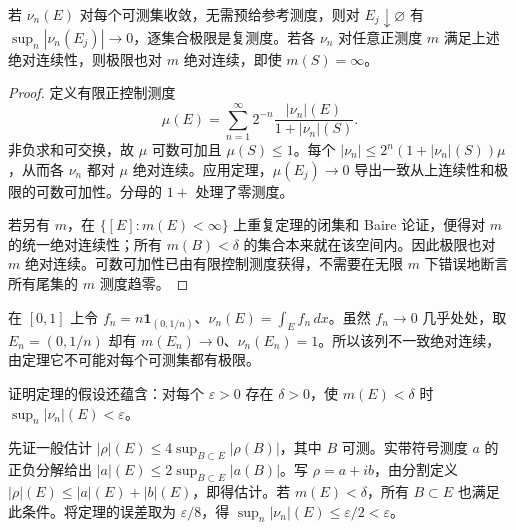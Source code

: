 \begin{corollary}[一致可数可加性与无限参考测度]\label{cor:y2-nikodym}
若 $\nu_n(E)$ 对每个可测集收敛，无需预给参考测度，则对 $E_j\downarrow\varnothing$ 有 $\sup_n|\nu_n(E_j)|\to0$，逐集合极限是复测度。若各 $\nu_n$ 对任意正测度 $m$ 满足上述绝对连续性，则极限也对 $m$ 绝对连续，即使 $m(S)=\infty$。
\end{corollary}
\begin{proof}
定义有限正控制测度
\[
 \mu(E)=\sum_{n=1}^\infty2^{-n}\frac{|\nu_n|(E)}{1+|\nu_n|(S)}.
\]
非负求和可交换，故 $\mu$ 可数可加且 $\mu(S)\le1$。每个 $|\nu_n|\le2^n(1+|\nu_n|(S))\mu$，从而各 $\nu_n$ 都对 $\mu$ 绝对连续。应用定理，$\mu(E_j)\to0$ 导出一致从上连续性和极限的可数可加性。分母的 $1+$ 处理了零测度。

若另有 $m$，在 $\{[E]:m(E)<\infty\}$ 上重复定理的闭集和 Baire 论证，便得对 $m$ 的统一绝对连续性；所有 $m(B)<\delta$ 的集合本来就在该空间内。因此极限也对 $m$ 绝对连续。可数可加性已由有限控制测度获得，不需要在无限 $m$ 下错误地断言所有尾集的 $m$ 测度趋零。
\end{proof}

\begin{example}[密度几乎处处收敛不能替代逐集合收敛]
在 $[0,1]$ 上令 $f_n=n\mathbf1_{(0,1/n)}$、$\nu_n(E)=\int_Ef_n\,dx$。虽然 $f_n\to0$ 几乎处处，取 $E_n=(0,1/n)$ 却有 $m(E_n)\to0$、$\nu_n(E_n)=1$。所以该列不一致绝对连续，由定理它不可能对每个可测集都有极限。
\end{example}

\begin{exercise}
证明定理的假设还蕴含：对每个 $\varepsilon>0$ 存在 $\delta>0$，使 $m(E)<\delta$ 时 $\sup_n|\nu_n|(E)<\varepsilon$。
\end{exercise}
\begin{solution}
先证一般估计 $|\rho|(E)\le4\sup_{B\subset E}|\rho(B)|$，其中 $B$ 可测。实带符号测度 $a$ 的正负分解给出 $|a|(E)\le2\sup_{B\subset E}|a(B)|$。写 $\rho=a+ib$，由分割定义 $|\rho|(E)\le|a|(E)+|b|(E)$，即得估计。若 $m(E)<\delta$，所有 $B\subset E$ 也满足此条件。将定理的误差取为 $\varepsilon/8$，得 $\sup_n|\nu_n|(E)\le\varepsilon/2<\varepsilon$。
\end{solution}
